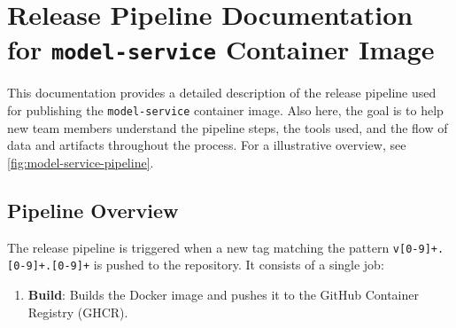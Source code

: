         

\section*{Release Pipeline Documentation for \texttt{model-service} Container Image}

This documentation provides a detailed description of the release pipeline used for publishing the \texttt{model-service} container image. Also here, the goal is to help new team members understand the pipeline steps, the tools used, and the flow of data and artifacts throughout the process. For a illustrative overview, see \autoref{fig:model-service-pipeline}.

\subsection{Pipeline Overview}

The release pipeline is triggered when a new tag matching the pattern \texttt{v[0-9]+.[0-9]+.[0-9]+} is pushed to the repository. It consists of a single job:

\begin{enumerate}
    \item \textbf{Build}: Builds the Docker image and pushes it to the GitHub Container Registry (GHCR).
\end{enumerate}

